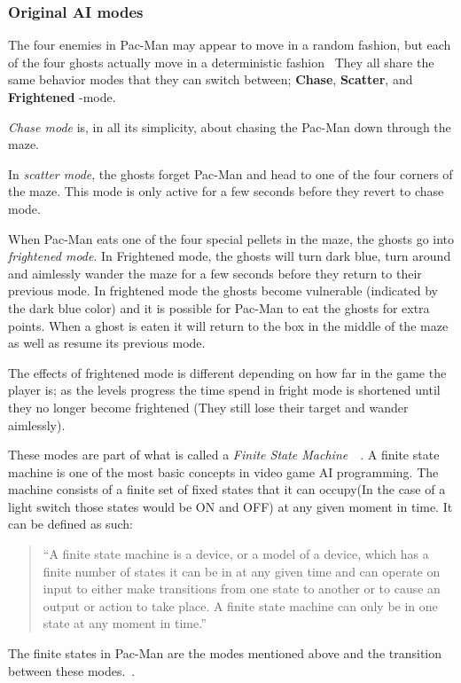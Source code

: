 
\subsubsection{Original AI modes} \label{sec:aimodes}
The four enemies in Pac-Man may appear to move in a random fashion, but each of the four ghosts actually move in a deterministic fashion~\autocite{Pittman2011} They all share the same behavior modes that they can switch between; \textbf{Chase}, \textbf{Scatter}, and \textbf{Frightened} -mode.

\emph{Chase mode} is, in all its simplicity, about chasing the Pac-Man down through the maze.

In \emph{scatter mode}, the ghosts forget Pac-Man and head to one of the four corners of the maze. This mode is only active for a few seconds before they revert to chase mode.

When Pac-Man eats one of the four special pellets in the maze, the ghosts go into \emph{frightened mode}. In Frightened mode, the ghosts will turn dark blue, turn around and aimlessly wander the maze for a few seconds before they return to their previous mode. In frightened mode the ghosts become vulnerable (indicated by the dark blue color) and it is possible for Pac-Man to eat the ghosts for extra points. When a ghost is eaten it will return to the box in the middle of the maze as well as resume its previous mode.

The effects of frightened mode is different depending on how far in the game the player is; as the levels progress the time spend in fright mode is shortened until they no longer become frightened (They still lose their target and wander aimlessly).

These modes are part of what is called a \emph{Finite State Machine}~\autocite[pp.44]{Buckland2005}~\autocite{Kehoe2009}.
A finite state machine is one of the most basic concepts in video game AI programming. The machine consists of a finite set of fixed states that it can occupy(In the case of a light switch those states would be ON and OFF) at any given moment in time. It can be defined as such:

\blockquote[\autocite{Buckland2005}]{\enquote{A finite state machine is a device, or a model of a device, which has a finite number of states it can be in at any given time and can operate on input to either make transitions from one state to another or to cause an output or action to take place. A finite state machine can only be in one state at any moment in time.}}

The finite states in Pac-Man are the modes mentioned above and the transition between these modes.~\autocite[pp.45]{Buckland2005}.